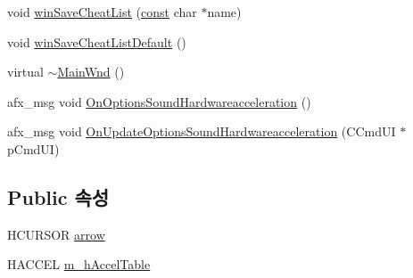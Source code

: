 \begin{DoxyCompactItemize}
\item 
void \mbox{\hyperlink{class_main_wnd_ab71924a5be91bd6193c6ea19ddd3d483}{win\+Save\+Cheat\+List}} (\mbox{\hyperlink{getopt1_8c_a2c212835823e3c54a8ab6d95c652660e}{const}} char $\ast$name)
\item 
void \mbox{\hyperlink{class_main_wnd_afd3b77fc621f2b464369c472262689ab}{win\+Save\+Cheat\+List\+Default}} ()
\item 
virtual \mbox{\hyperlink{class_main_wnd_a9b43d1266651ee4d6e8b97cd4f9aba98}{$\sim$\+Main\+Wnd}} ()
\item 
afx\+\_\+msg void \mbox{\hyperlink{class_main_wnd_a8adfcf00230b2bf44aa4a077bcdb6a0e}{On\+Options\+Sound\+Hardwareacceleration}} ()
\item 
afx\+\_\+msg void \mbox{\hyperlink{class_main_wnd_aac8ad5e0c9a1a7051aea0f5327787f94}{On\+Update\+Options\+Sound\+Hardwareacceleration}} (C\+Cmd\+UI $\ast$p\+Cmd\+UI)
\end{DoxyCompactItemize}
\subsection*{Public 속성}
\begin{DoxyCompactItemize}
\item 
H\+C\+U\+R\+S\+OR \mbox{\hyperlink{class_main_wnd_aacb2a400730b1e95ee16792acd6a089f}{arrow}}
\item 
H\+A\+C\+C\+EL \mbox{\hyperlink{class_main_wnd_adde0f53e1d63ef457254bfb346e48152}{m\+\_\+h\+Accel\+Table}}
\end{DoxyCompactItemize}
